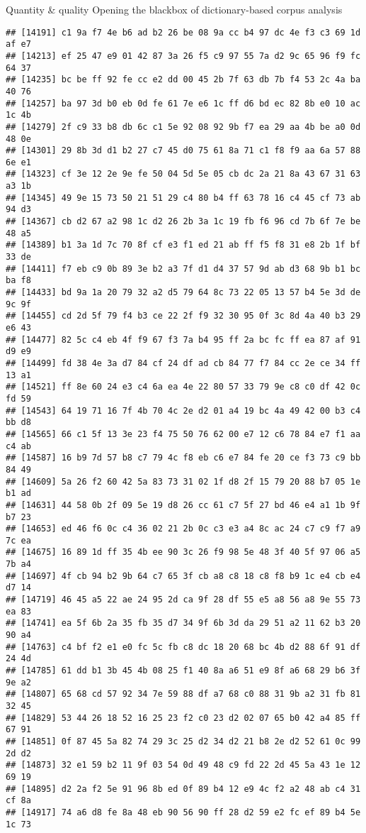 \documentclass[
  ignorenonframetext,
]{beamer}
\begin{document}
\begin{frame}[fragile]{Quantity \& quality \textbar{} Opening the
blackbox of dictionary-based corpus analysis}
\begin{verbatim}
## [14191] c1 9a f7 4e b6 ad b2 26 be 08 9a cc b4 97 dc 4e f3 c3 69 1d af e7
## [14213] ef 25 47 e9 01 42 87 3a 26 f5 c9 97 55 7a d2 9c 65 96 f9 fc 64 37
## [14235] bc be ff 92 fe cc e2 dd 00 45 2b 7f 63 db 7b f4 53 2c 4a ba 40 76
## [14257] ba 97 3d b0 eb 0d fe 61 7e e6 1c ff d6 bd ec 82 8b e0 10 ac 1c 4b
## [14279] 2f c9 33 b8 db 6c c1 5e 92 08 92 9b f7 ea 29 aa 4b be a0 0d 48 0e
## [14301] 29 8b 3d d1 b2 27 c7 45 d0 75 61 8a 71 c1 f8 f9 aa 6a 57 88 6e e1
## [14323] cf 3e 12 2e 9e fe 50 04 5d 5e 05 cb dc 2a 21 8a 43 67 31 63 a3 1b
## [14345] 49 9e 15 73 50 21 51 29 c4 80 b4 ff 63 78 16 c4 45 cf 73 ab 94 d3
## [14367] cb d2 67 a2 98 1c d2 26 2b 3a 1c 19 fb f6 96 cd 7b 6f 7e be 48 a5
## [14389] b1 3a 1d 7c 70 8f cf e3 f1 ed 21 ab ff f5 f8 31 e8 2b 1f bf 33 de
## [14411] f7 eb c9 0b 89 3e b2 a3 7f d1 d4 37 57 9d ab d3 68 9b b1 bc ba f8
## [14433] bd 9a 1a 20 79 32 a2 d5 79 64 8c 73 22 05 13 57 b4 5e 3d de 9c 9f
## [14455] cd 2d 5f 79 f4 b3 ce 22 2f f9 32 30 95 0f 3c 8d 4a 40 b3 29 e6 43
## [14477] 82 5c c4 eb 4f f9 67 f3 7a b4 95 ff 2a bc fc ff ea 87 af 91 d9 e9
## [14499] fd 38 4e 3a d7 84 cf 24 df ad cb 84 77 f7 84 cc 2e ce 34 ff 13 a1
## [14521] ff 8e 60 24 e3 c4 6a ea 4e 22 80 57 33 79 9e c8 c0 df 42 0c fd 59
## [14543] 64 19 71 16 7f 4b 70 4c 2e d2 01 a4 19 bc 4a 49 42 00 b3 c4 bb d8
## [14565] 66 c1 5f 13 3e 23 f4 75 50 76 62 00 e7 12 c6 78 84 e7 f1 aa c4 ab
## [14587] 16 b9 7d 57 b8 c7 79 4c f8 eb c6 e7 84 fe 20 ce f3 73 c9 bb 84 49
## [14609] 5a 26 f2 60 42 5a 83 73 31 02 1f d8 2f 15 79 20 88 b7 05 1e b1 ad
## [14631] 44 58 0b 2f 09 5e 19 d8 26 cc 61 c7 5f 27 bd 46 e4 a1 1b 9f b7 23
## [14653] ed 46 f6 0c c4 36 02 21 2b 0c c3 e3 a4 8c ac 24 c7 c9 f7 a9 7c ea
## [14675] 16 89 1d ff 35 4b ee 90 3c 26 f9 98 5e 48 3f 40 5f 97 06 a5 7b a4
## [14697] 4f cb 94 b2 9b 64 c7 65 3f cb a8 c8 18 c8 f8 b9 1c e4 cb e4 d7 14
## [14719] 46 45 a5 22 ae 24 95 2d ca 9f 28 df 55 e5 a8 56 a8 9e 55 73 ea 83
## [14741] ea 5f 6b 2a 35 fb 35 d7 34 9f 6b 3d da 29 51 a2 11 62 b3 20 90 a4
## [14763] c4 bf f2 e1 e0 fc 5c fb c8 dc 18 20 68 bc 4b d2 88 6f 91 df 24 4d
## [14785] 61 dd b1 3b 45 4b 08 25 f1 40 8a a6 51 e9 8f a6 68 29 b6 3f 9e a2
## [14807] 65 68 cd 57 92 34 7e 59 88 df a7 68 c0 88 31 9b a2 31 fb 81 32 45
## [14829] 53 44 26 18 52 16 25 23 f2 c0 23 d2 02 07 65 b0 42 a4 85 ff 67 91
## [14851] 0f 87 45 5a 82 74 29 3c 25 d2 34 d2 21 b8 2e d2 52 61 0c 99 2d d2
## [14873] 32 e1 59 b2 11 9f 03 54 0d 49 48 c9 fd 22 2d 45 5a 43 1e 12 69 19
## [14895] d2 2a f2 5e 91 96 8b ed 0f 89 b4 12 e9 4c f2 a2 48 ab c4 31 cf 8a
## [14917] 74 a6 d8 fe 8a 48 eb 90 56 90 ff 28 d2 59 e2 fc ef 89 b4 5e 1c 73

\end{verbatim}
\end{frame}
\end{document}
